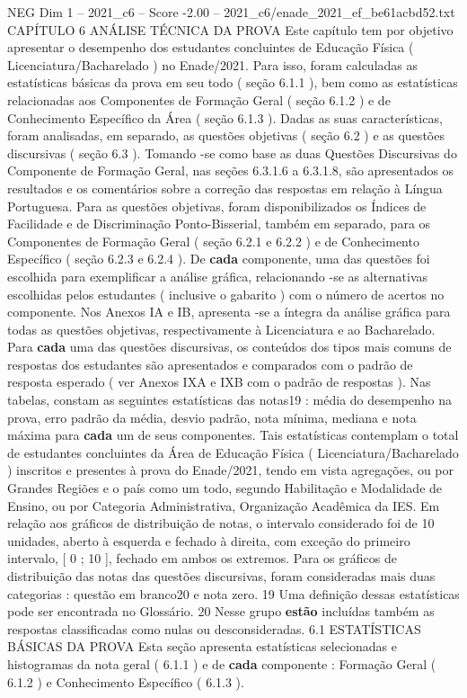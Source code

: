 \begin{textsample}{NEG Dim 1 – 2021\_c6 – Score -2.00 – 2021\_c6/enade\_2021\_ef\_be61acbd52.txt}  \label{ex:f1_neg_240}
CAPÍTULO 6 ANÁLISE TÉCNICA DA PROVA Este capítulo tem por objetivo apresentar o desempenho dos estudantes concluintes de Educação Física ( Licenciatura/Bacharelado ) no Enade/2021.
Para isso, foram calculadas as estatísticas básicas da prova em seu todo ( seção 6.1.1 ), bem como as estatísticas relacionadas aos Componentes de Formação Geral ( seção 6.1.2 ) e de Conhecimento Específico da Área ( seção 6.1.3 ).
Dadas as suas características, foram analisadas, em separado, as questões objetivas ( seção 6.2 ) e as questões discursivas ( seção 6.3 ).
Tomando -se como base as duas Questões Discursivas do Componente de Formação Geral, nas seções 6.3.1.6 a 6.3.1.8, são apresentados os resultados e os comentários sobre a correção das respostas em relação à Língua Portuguesa.
Para as questões objetivas, foram disponibilizados os Índices de Facilidade e de Discriminação Ponto-Bisserial, também em separado, para os Componentes de Formação Geral ( seção 6.2.1 e 6.2.2 ) e de Conhecimento Específico ( seção 6.2.3 e 6.2.4 ).
De \textbf{cada} componente, uma das questões foi escolhida para exemplificar a análise gráfica, relacionando -se as alternativas escolhidas pelos estudantes ( inclusive o gabarito ) com o número de acertos no componente.
Nos Anexos IA e IB, apresenta -se a íntegra da análise gráfica para todas as questões objetivas, respectivamente à Licenciatura e ao Bacharelado.
Para \textbf{cada} uma das questões discursivas, os conteúdos dos tipos mais comuns de respostas dos estudantes são apresentados e comparados com o padrão de resposta esperado ( ver Anexos IXA e IXB com o padrão de respostas ).
Nas tabelas, constam as seguintes estatísticas das notas19 : média do desempenho na prova, erro padrão da média, desvio padrão, nota mínima, mediana e nota máxima para \textbf{cada} um de seus componentes.
Tais estatísticas contemplam o total de estudantes concluintes da Área de Educação Física ( Licenciatura/Bacharelado ) inscritos e presentes à prova do Enade/2021, tendo em vista agregações, ou por Grandes Regiões e o país como um todo, segundo Habilitação e Modalidade de Ensino, ou por Categoria Administrativa, Organização Acadêmica da IES.
Em relação aos gráficos de distribuição de notas, o intervalo considerado foi de 10 unidades, aberto à esquerda e fechado à direita, com exceção do primeiro intervalo, [ 0 ; 10 ], fechado em ambos os extremos.
Para os gráficos de distribuição das notas das questões discursivas, foram consideradas mais duas categorias : questão em branco20 e nota zero. 19 Uma definição dessas estatísticas pode ser encontrada no Glossário. 20 Nesse grupo \textbf{estão} incluídas também as respostas classificadas como nulas ou desconsideradas. 6.1 ESTATÍSTICAS BÁSICAS DA PROVA Esta seção apresenta estatísticas selecionadas e histogramas da nota geral ( 6.1.1 ) e de \textbf{cada} componente : Formação Geral ( 6.1.2 ) e Conhecimento Específico ( 6.1.3 ).

\end{textsample}

